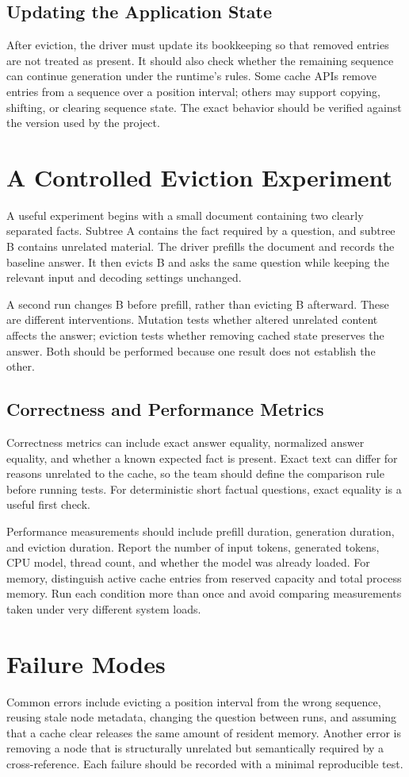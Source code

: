 \documentclass{article}
\begin{document}
\subsection{Updating the Application State}
After eviction, the driver must update its bookkeeping so that removed entries are not treated as present. It should also check whether the remaining sequence can continue generation under the runtime's rules. Some cache APIs remove entries from a sequence over a position interval; others may support copying, shifting, or clearing sequence state. The exact behavior should be verified against the version used by the project.

\section{A Controlled Eviction Experiment}
A useful experiment begins with a small document containing two clearly separated facts. Subtree A contains the fact required by a question, and subtree B contains unrelated material. The driver prefills the document and records the baseline answer. It then evicts B and asks the same question while keeping the relevant input and decoding settings unchanged.

A second run changes B before prefill, rather than evicting B afterward. These are different interventions. Mutation tests whether altered unrelated content affects the answer; eviction tests whether removing cached state preserves the answer. Both should be performed because one result does not establish the other.

\subsection{Correctness and Performance Metrics}
Correctness metrics can include exact answer equality, normalized answer equality, and whether a known expected fact is present. Exact text can differ for reasons unrelated to the cache, so the team should define the comparison rule before running tests. For deterministic short factual questions, exact equality is a useful first check.

Performance measurements should include prefill duration, generation duration, and eviction duration. Report the number of input tokens, generated tokens, CPU model, thread count, and whether the model was already loaded. For memory, distinguish active cache entries from reserved capacity and total process memory. Run each condition more than once and avoid comparing measurements taken under very different system loads.

\section{Failure Modes}
Common errors include evicting a position interval from the wrong sequence, reusing stale node metadata, changing the question between runs, and assuming that a cache clear releases the same amount of resident memory. Another error is removing a node that is structurally unrelated but semantically required by a cross-reference. Each failure should be recorded with a minimal reproducible test.
\end{document}
